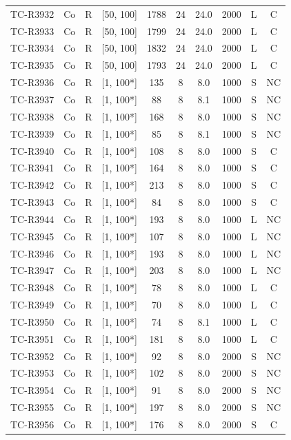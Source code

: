 \begin{longtable}{lccccccccc}
TC-R3932 & Co & R & [50, 100] & 1788 & 24 & 24.0 & 2000 & L & C \\
TC-R3933 & Co & R & [50, 100] & 1799 & 24 & 24.0 & 2000 & L & C \\
TC-R3934 & Co & R & [50, 100] & 1832 & 24 & 24.0 & 2000 & L & C \\
TC-R3935 & Co & R & [50, 100] & 1793 & 24 & 24.0 & 2000 & L & C \\
TC-R3936 & Co & R & [1, 100*] & 135 & 8 & 8.0 & 1000 & S & NC \\
TC-R3937 & Co & R & [1, 100*] & 88 & 8 & 8.1 & 1000 & S & NC \\
TC-R3938 & Co & R & [1, 100*] & 168 & 8 & 8.0 & 1000 & S & NC \\
TC-R3939 & Co & R & [1, 100*] & 85 & 8 & 8.1 & 1000 & S & NC \\
TC-R3940 & Co & R & [1, 100*] & 108 & 8 & 8.0 & 1000 & S & C \\
TC-R3941 & Co & R & [1, 100*] & 164 & 8 & 8.0 & 1000 & S & C \\
TC-R3942 & Co & R & [1, 100*] & 213 & 8 & 8.0 & 1000 & S & C \\
TC-R3943 & Co & R & [1, 100*] & 84 & 8 & 8.0 & 1000 & S & C \\
TC-R3944 & Co & R & [1, 100*] & 193 & 8 & 8.0 & 1000 & L & NC \\
TC-R3945 & Co & R & [1, 100*] & 107 & 8 & 8.0 & 1000 & L & NC \\
TC-R3946 & Co & R & [1, 100*] & 193 & 8 & 8.0 & 1000 & L & NC \\
TC-R3947 & Co & R & [1, 100*] & 203 & 8 & 8.0 & 1000 & L & NC \\
TC-R3948 & Co & R & [1, 100*] & 78 & 8 & 8.0 & 1000 & L & C \\
TC-R3949 & Co & R & [1, 100*] & 70 & 8 & 8.0 & 1000 & L & C \\
TC-R3950 & Co & R & [1, 100*] & 74 & 8 & 8.1 & 1000 & L & C \\
TC-R3951 & Co & R & [1, 100*] & 181 & 8 & 8.0 & 1000 & L & C \\
TC-R3952 & Co & R & [1, 100*] & 92 & 8 & 8.0 & 2000 & S & NC \\
TC-R3953 & Co & R & [1, 100*] & 102 & 8 & 8.0 & 2000 & S & NC \\
TC-R3954 & Co & R & [1, 100*] & 91 & 8 & 8.0 & 2000 & S & NC \\
TC-R3955 & Co & R & [1, 100*] & 197 & 8 & 8.0 & 2000 & S & NC \\
TC-R3956 & Co & R & [1, 100*] & 176 & 8 & 8.0 & 2000 & S & C \\

\end{longtable}
